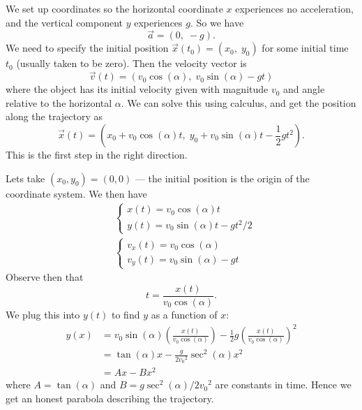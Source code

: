 \M We set up coordinates so the horizontal coordinate $x$ experiences no
acceleration, and the vertical component $y$ experiences $g$. So we have
\begin{equation}
\vec{a} = (0,\; -g).
\end{equation}
We need to specify the initial position $\vec{x}(t_{0})=(x_{0},\; y_{0})$
for some initial time $t_{0}$ (usually taken to be zero). Then the
velocity vector is
\begin{equation}
\vec{v}(t) = (v_{0}\cos(\alpha),\; v_{0}\sin(\alpha) - gt)
\end{equation}
where the object has its initial velocity given with magnitude $v_{0}$
and angle relative to the horizontal $\alpha$. We can solve this using
calculus, and get the position along the trajectory as
\begin{equation}
\vec{x}(t) = \left(x_{0} + v_{0}\cos(\alpha)t,\; y_{0} + v_{0}\sin(\alpha)t-\frac{1}{2}gt^{2}\right).
\end{equation}
This is the first step in the right direction.

Lets take $(x_{0}, y_{0})=(0,0)$ --- the initial position is the origin
of the coordinate system. We then have
\begin{subequations}
\begin{align}
&\left\{
\begin{array}{l}
x(t) = v_{0}\cos(\alpha)t\\
y(t) = v_{0}\sin(\alpha)t - gt^{2}/2
\end{array}\right.\\
&\left\{
\begin{array}{l}
v_{x}(t) = v_{0}\cos(\alpha)\\
v_{y}(t) = v_{0}\sin(\alpha) - gt
\end{array}\right.
\end{align}
\end{subequations}
Observe then that
\begin{equation}
t = \frac{x(t)}{v_{0}\cos(\alpha)}.
\end{equation}
We plug this into $y(t)$ to find $y$ as a function of $x$:
\begin{equation}
\begin{split}
y(x) 
&=v_{0}\sin(\alpha)\left(\frac{x(t)}{v_{0}\cos(\alpha)}\right)
   - \frac{1}{2}g\left(\frac{x(t)}{v_{0}\cos(\alpha)}\right)^{2}\\
&=\tan(\alpha)x - \frac{g}{2{v_{0}}^{2}}\sec^{2}(\alpha)x^{2}\\
&=Ax-Bx^{2}
\end{split}
\end{equation}
where $A=\tan(\alpha)$ and $B=g\sec^{2}(\alpha)/2{v_{0}}^{2}$ are
constants in time. Hence we get an honest parabola describing the
trajectory.

